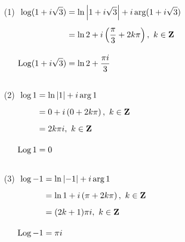 \begin{example}\label{logcalc}\hfill
\begin{itemize}[itemsep=1.5em]
\item[(1)] $\begin{aligned}[t]
\log(1 + i\sqrt{3}) &= \ln\left\lvert1 + i\sqrt{3}\right\rvert + i\arg(1 + i\sqrt{3})\\[0.5em]
&= \ln 2 + i\left(\dfrac{\pi}{3} + 2k\pi\right),\ k \in \mathbf Z\\[1em]
\operatorname{Log}(1 + i\sqrt{3}) &= \ln 2 + \dfrac{\pi i}{3}\\[1em]
\end{aligned}$
\end{itemize}

\begin{multicols}{2}
\begin{itemize}
\item[(2)] $\begin{aligned}[t]
\log 1 &= \ln\left\lvert1\right\rvert + i\arg 1\\[0.5em]
&= 0 + i\left(0 + 2k\pi\right),\ k \in \mathbf Z\\[0.5em]
&= 2k\pi i,\ k \in \mathbf Z\\[1em]
\operatorname{Log} 1 &= 0\\[1em]
\end{aligned}$

\item[(3)] $\begin{aligned}[t]
\log -1 &= \ln\left\lvert-1\right\rvert + i\arg 1\\[0.5em]
&= \ln 1 + i\left(\pi + 2k\pi\right),\ k \in \mathbf Z\\[0.5em]
&= (2k+1)\pi i,\ k \in \mathbf Z\\[1em]
\operatorname{Log} -1 &= \pi i\\[1em]
\end{aligned}$
\end{itemize}
\end{multicols}


\end{example}
